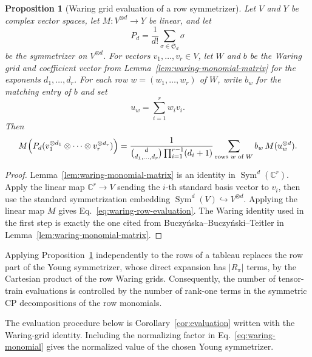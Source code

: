 \documentclass[11pt]{article}
\newcommand{\dsC}{\mathbb{C}}
\newcommand{\Sym}{\operatorname{Sym}}
\newtheorem{proposition}[theorem]{Proposition}
\theoremstyle{definition}
\begin{document}
\begin{proposition}[Waring grid evaluation of a row symmetrizer]\label{prop:waring-grid-evaluation}
  Let $V$ and $Y$ be complex vector spaces, let $M:V^{\otimes d}\to Y$ be linear, and let
  \[
    P_d=\frac{1}{d!}\sum_{\sigma\in\mathfrak S_d}\sigma
  \]
  be the symmetrizer on $V^{\otimes d}$.  For vectors $v_1,\dots,v_r\in V$, let $W$ and $b$ be the Waring grid and coefficient vector from Lemma~\ref{lem:waring-monomial-matrix} for the exponents $d_1,\dots,d_r$.  For each row $w=(w_1,\dots,w_r)$ of $W$, write $b_w$ for the matching entry of $b$ and set
  \[
    u_w=\sum_{i=1}^r w_i v_i.
  \]
  Then
  \begin{equation}\label{eq:waring-row-evaluation}
    M\!\left(P_d(v_1^{\otimes d_1}\otimes\cdots\otimes v_r^{\otimes d_r})\right)
    =
    \frac{1}{
      \binom{d}{d_1,\dots,d_r}
      \prod_{i=1}^{r-1}(d_i+1)}
    \sum_{\textup{rows }w\textup{ of }W} b_w\,M(u_w^{\otimes d}).
  \end{equation}
\end{proposition}
\begin{proof}
  Lemma~\ref{lem:waring-monomial-matrix} is an identity in $\Sym^d(\dsC^r)$.  Apply the linear map $\dsC^r\to V$ sending the $i$-th standard basis vector to $v_i$, then use the standard symmetrization embedding $\Sym^d(V)\hookrightarrow V^{\otimes d}$.  Applying the linear map $M$ gives Eq.~\eqref{eq:waring-row-evaluation}.  The Waring identity used in the first step is exactly the one cited from Buczy\'nska--Buczy\'nski--Teitler in Lemma~\ref{lem:waring-monomial-matrix}.
\end{proof}

Applying Proposition~\ref{prop:waring-grid-evaluation} independently to the rows of a tableau replaces the row part of the Young symmetrizer, whose direct expansion has $|R_\pi|$ terms, by the Cartesian product of the row Waring grids.  Consequently, the number of tensor-train evaluations is controlled by the number of rank-one terms in the symmetric CP decompositions of the row monomials.

The evaluation procedure below is Corollary~\ref{cor:evaluation} written with the Waring-grid identity.  Including the normalizing factor in Eq.~\eqref{eq:waring-monomial} gives the normalized value of the chosen Young symmetrizer.
\end{document}
